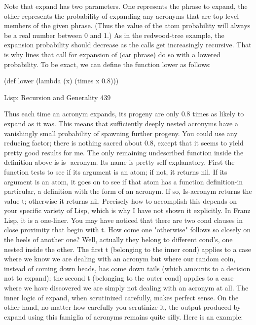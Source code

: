         Note that expand has two parameters. One represents the phrase to expand,
the other represents the probability of expanding any acronyms that are top-level
members of the given phrase. (Thus the value of the atom probability will always be
a real number between 0 and 1.) As in the redwood-tree example, the expansion
probability should decrease as the calls get increasingly recursive. That is why lines
that call for expansion of (car phrase) do so with a lowered probability. To be exact,
we can define the function lower as follows:

(def lower (lambda (x) (times x 0.8)))




Lisp: Recursion and Generality                                                         439

Thus each time an acronym expands, its progeny are only 0.8 times as likely to
expand as it was. This means that sufficiently deeply nested acronyms have a
vanishingly small probability of spawning further progeny. You could use any
reducing factor; there is nothing sacred about 0.8, except that it seems to yield pretty
good results for me.
         The only remaining undescribed function inside the definition above is is-
acronym. Its name is pretty self-explanatory. First the function tests to see if its
argument is an atom; if not, it returns nil. If its argument is an atom, it goes on to see
if that atom has a function definition-in particular, a definition with the form of an
acronym. If so, Is-acronym returns the value t; otherwise it returns nil. Precisely how
to accomplish this depends on your specific variety of Lisp, which is why I have not
shown it explicitly. In Franz Lisp, it is a one-liner.
         You may have noticed that there are two cond clauses in close proximity that
begin with t. How come one "otherwise" follows so closely on the heels of another
one? Well, actually they belong to different cond's, one nested inside the other. The
first t (belonging to the inner cond) applies to a case where we know we are dealing
with an acronym but where our random coin, instead of coming down heads, has
come down tails (which amounts to a decision not to expand); the second t (belonging
to the outer cond) applies to a case where we have discovered we are simply not
dealing with an acronym at all.
         The inner logic of expand, when scrutinized carefully, makes perfect sense.
On the other hand, no matter how carefully you scrutinize it, the output produced by
expand using this famiglia of acronyms remains quite silly. Here is an example:

